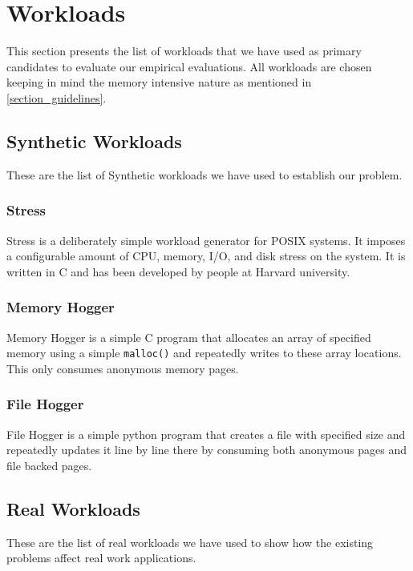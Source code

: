   \section{Workloads}
  
    This section presents the list of workloads that we have used as primary candidates to evaluate our empirical evaluations. All 
workloads are chosen keeping in mind the memory intensive nature as mentioned in \ref{section_guidelines}.  
    
    \subsection{Synthetic Workloads}
    
      These are the list of Synthetic workloads we have used to establish our problem.
      
      \subsubsection{Stress}
	Stress \cite{stress} is a deliberately simple workload generator for POSIX systems. It imposes a configurable amount of CPU, 
memory, I/O, and disk stress on the system. It is written in C and has been developed by people at Harvard university. 
      
      \subsubsection{Memory Hogger}
	Memory Hogger is a simple C program that allocates an array of specified memory using a simple \texttt{malloc()} and repeatedly 
writes to these array locations. This only consumes anonymous memory pages.
      
      \subsubsection{File Hogger}
	File Hogger is a simple python program that creates a file with specified size and repeatedly updates it line by line there by 
consuming both anonymous pages and file backed pages.

    \subsection{Real Workloads}
    
      These are the list of real workloads we have used to show how the existing problems affect real work applications.
      
